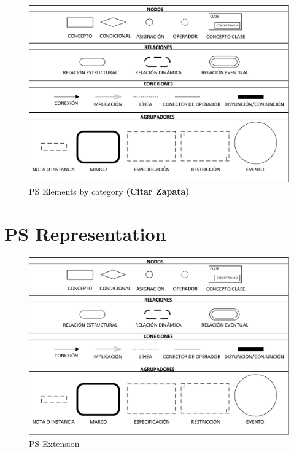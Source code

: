 \documentclass[review]{elsarticle}
\begin{document}
\begin{figure}
	\centering
	\includegraphics[width=1.0\textwidth]{Figures/PSElements.pdf}
	\caption{PS Elements by category {\color{red} \textbf{(Citar Zapata)}}}
	\label{fig:PS_Extended}
\end{figure}

\section{PS Representation}
\begin{figure}
	\centering
	\includegraphics[width=1.2\textwidth]{Figures/PSElements.pdf}
	\caption{PS Extension}
	\label{fig:PS_Translated}
\end{figure}
\end{document}
